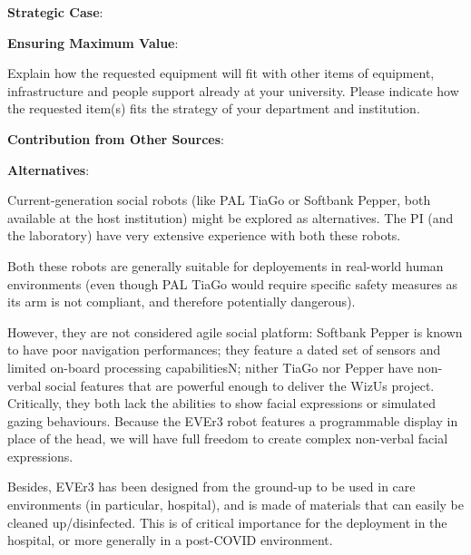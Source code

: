 \textbf{Strategic Case}:



\textbf{Ensuring Maximum Value}:

Explain how the requested equipment will fit with other items of equipment,
infrastructure and people support already at your university. Please indicate
how the requested item(s) fits the strategy of your department and institution.

\textbf{Contribution from Other Sources}:




\textbf{Alternatives}:


Current-generation social robots (like PAL TiaGo or Softbank Pepper, both
available at the host institution) might be
explored as alternatives. The PI (and the laboratory) have very extensive
experience with both these robots.

Both these robots are generally suitable for deployements in real-world human
environments (even though PAL TiaGo would require specific safety measures as
its arm is not compliant, and therefore potentially dangerous).

However, they are not considered agile social platform: Softbank Pepper is known
to have poor navigation performances; they feature a dated set of sensors and
limited on-board processing capabilitiesN; nither TiaGo nor Pepper have
non-verbal social features that are powerful enough to deliver the WizUs
project. Critically, they both lack the abilities to show facial expressions or
simulated gazing behaviours. Because the EVEr3 robot features a programmable
display in place of the head, we will have full freedom to create complex
non-verbal facial expressions.

Besides, EVEr3 has been designed from the ground-up to be used in care
environments (in particular, hospital), and is made of materials that can easily
be cleaned up/disinfected. This is of critical importance for the deployment in
the hospital, or more generally in a post-COVID environment.



